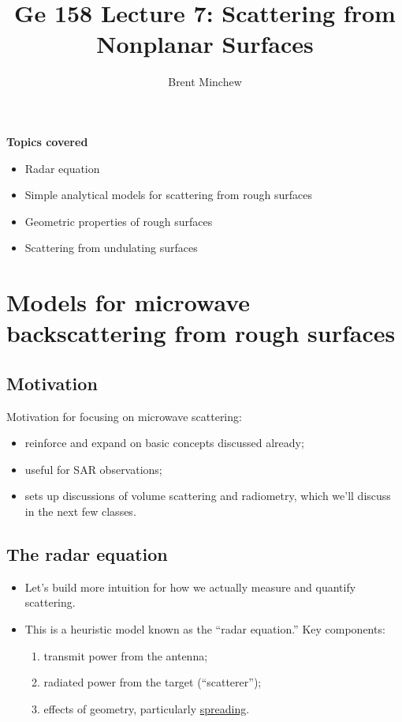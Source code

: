 \documentclass[11pt, oneside]{article}
\title{Ge 158 Lecture 7: Scattering from Nonplanar Surfaces}
\author{Brent Minchew}
\date{}
\begin{document}
\maketitle

\noindent\textbf{Topics covered}
\begin{itemize}
	\item Radar equation
	\item Simple analytical models for scattering from rough surfaces
	\item Geometric properties of rough surfaces
	\item Scattering from undulating surfaces
\end{itemize}

\section{Models for microwave backscattering from rough surfaces}

\subsection{Motivation}

Motivation for focusing on microwave scattering:
\begin{itemize}
	\item reinforce and expand on basic concepts discussed already;
	\item useful for SAR observations;
	\item sets up discussions of volume scattering and radiometry, which we'll discuss in the next few classes.
\end{itemize}

\subsection{The radar equation}
\label{s:radar}

\begin{itemize}
	\item Let's build more intuition for how we actually measure and quantify scattering.
	\item This is a heuristic model known as the ``radar equation.'' Key components:
	\begin{enumerate}
		\item transmit power from the antenna;
		\item radiated power from the target (``scatterer'');
		\item effects of geometry, particularly \underline{spreading}.
	\end{enumerate}
\end{itemize}
\end{document}
